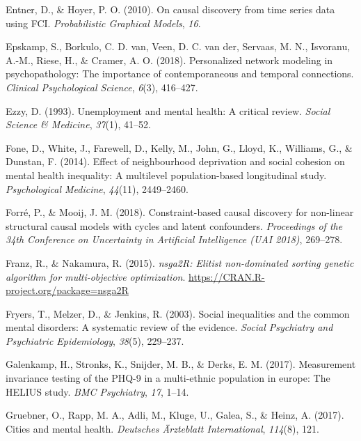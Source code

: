 \documentclass[
]{article}
\newlength{\cslhangindent}
\newenvironment{CSLReferences}[2] %
 {\begin{list}{}{%
  \setlength{\itemindent}{0pt}
  \setlength{\leftmargin}{0pt}
  \setlength{\parsep}{0pt}
  \ifodd #1
   \setlength{\leftmargin}{\cslhangindent}
   \setlength{\itemindent}{-1\cslhangindent}
  \fi
  \setlength{\itemsep}{#2\baselineskip}}}
 {\end{list}}
\begin{document}
\begin{CSLReferences}{1}{0}
Entner, D., \& Hoyer, P. O. (2010). On causal discovery from time series
data using FCI. \emph{Probabilistic Graphical Models}, \emph{16}.

Epskamp, S., Borkulo, C. D. van, Veen, D. C. van der, Servaas, M. N.,
Isvoranu, A.-M., Riese, H., \& Cramer, A. O. (2018). Personalized
network modeling in psychopathology: The importance of contemporaneous
and temporal connections. \emph{Clinical Psychological Science},
\emph{6}(3), 416--427.

Ezzy, D. (1993). Unemployment and mental health: A critical review.
\emph{Social Science \& Medicine}, \emph{37}(1), 41--52.

Fone, D., White, J., Farewell, D., Kelly, M., John, G., Lloyd, K.,
Williams, G., \& Dunstan, F. (2014). Effect of neighbourhood deprivation
and social cohesion on mental health inequality: A multilevel
population-based longitudinal study. \emph{Psychological Medicine},
\emph{44}(11), 2449--2460.

Forré, P., \& Mooij, J. M. (2018). Constraint-based causal discovery for
non-linear structural causal models with cycles and latent confounders.
\emph{Proceedings of the 34th Conference on Uncertainty in Artificial
Intelligence (UAI 2018)}, 269--278.

Franz, R., \& Nakamura, R. (2015). \emph{nsga2R: Elitist non-dominated
sorting genetic algorithm for multi-objective optimization}.
\url{https://CRAN.R-project.org/package=nsga2R}

Fryers, T., Melzer, D., \& Jenkins, R. (2003). Social inequalities and
the common mental disorders: A systematic review of the evidence.
\emph{Social Psychiatry and Psychiatric Epidemiology}, \emph{38}(5),
229--237.

Galenkamp, H., Stronks, K., Snijder, M. B., \& Derks, E. M. (2017).
Measurement invariance testing of the PHQ-9 in a multi-ethnic population
in europe: The HELIUS study. \emph{BMC Psychiatry}, \emph{17}, 1--14.

Gruebner, O., Rapp, M. A., Adli, M., Kluge, U., Galea, S., \& Heinz, A.
(2017). Cities and mental health. \emph{Deutsches {Ä}rzteblatt
International}, \emph{114}(8), 121.


\end{CSLReferences}
\end{document}

